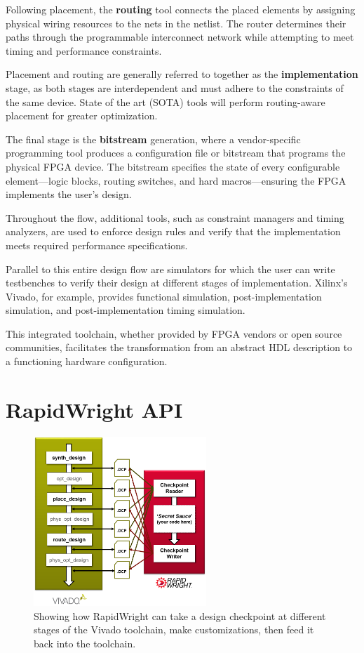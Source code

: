 \documentclass[twocolumn]{article}
\begin{document}
    Following placement, the \textbf{routing} tool connects the placed elements by assigning physical wiring resources to the nets in the netlist. 
    The router determines their paths through the programmable interconnect network while attempting to meet timing and performance constraints.
    
    Placement and routing are generally referred to together as the \textbf{implementation} stage, as both stages are interdependent and must adhere to the constraints of the same device.
    State of the art (SOTA) tools will perform routing-aware placement for greater optimization.

    The final stage is the \textbf{bitstream} generation, where a vendor-specific programming tool produces a configuration file or bitstream that programs the physical FPGA device. 
    The bitstream specifies the state of every configurable element—logic blocks, routing switches, and hard macros—ensuring the FPGA implements the user's design.

    Throughout the flow, additional tools, such as constraint managers and timing analyzers, are used to enforce design rules and verify that the implementation meets required performance specifications. 

    Parallel to this entire design flow are simulators for which the user can write testbenches to verify their design at different stages of implementation.
    Xilinx's Vivado, for example, provides functional simulation, post-implementation simulation, and post-implementation timing simulation.

    This integrated toolchain, whether provided by FPGA vendors or open source communities, facilitates the transformation from an abstract HDL description to a functioning hardware configuration.


\section{RapidWright API}
    \begin{figure}
        \centering
        \includegraphics[width=6.5cm]{figures/vivado_dcps.png}
        \caption{Showing how RapidWright can take a design checkpoint at different stages of the Vivado toolchain, make customizations, then feed it back into the toolchain.}
        \label{fig:device_carry_chain_routing}
    \end{figure}
\end{document}
